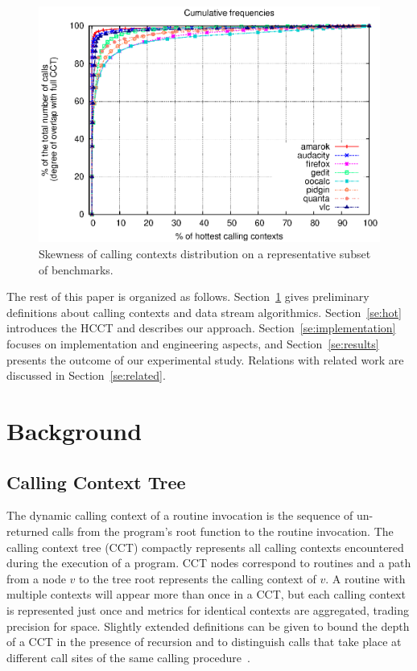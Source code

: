 \documentclass{sigplanconf}
\begin{document}
\begin{figure}[t]
\includegraphics[width=\columnwidth]{charts/cumulative.eps}
\caption{Skewness of calling contexts distribution on a representative subset of benchmarks.}
\label{fig:skewness}
\end{figure}

\noindent The rest of this paper is organized as follows. Section~\ref{se:background} gives preliminary definitions about calling contexts and data stream algorithmics. Section~\ref{se:hot}  introduces the HCCT and describes our approach. Section~\ref{se:implementation} focuses on implementation and engineering aspects, and Section~\ref{se:results} presents the outcome of our experimental study. Relations with related work are discussed in Section~\ref{se:related}.


\section{Background}
\label{se:background}

\subsection{Calling Context Tree}
\label{ss:callingContextTree}

The dynamic calling context of a routine invocation is the sequence of un-returned calls from the program's root
function to the routine invocation. The calling context tree (CCT) compactly represents all calling contexts encountered during the execution of a program. CCT nodes correspond to routines and a path from a node $v$ to the tree root represents the calling context of $v$. A routine with multiple contexts will appear more than once in a CCT, but each calling context is represented just once and metrics for identical contexts are aggregated, trading precision for space. Slightly extended definitions can be given to bound the depth of a CCT in the presence of recursion and to distinguish calls that take place at different call sites of the same calling procedure~\cite{ABL97}.
\end{document}
